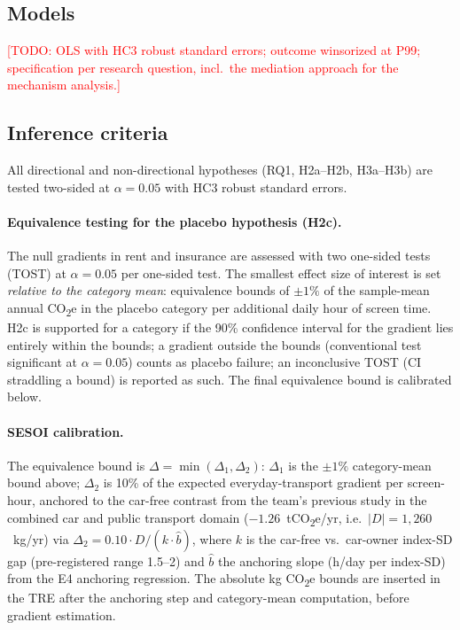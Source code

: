 \documentclass[11pt,a4paper]{article}
\newcommand{\todo}[1]{\textcolor{red}{[TODO: #1]}}
\begin{document}
\subsection{Models}
\todo{OLS with HC3 robust standard errors; outcome winsorized at P99;
specification per research question, incl.\ the mediation approach for the
mechanism analysis.}

\subsection{Inference criteria}
\label{sec:inference}
All directional and non-directional hypotheses (RQ1, H2a--H2b, H3a--H3b) are
tested two-sided at $\alpha = 0.05$ with HC3 robust standard errors.

\paragraph{Equivalence testing for the placebo hypothesis (H2c).} The null
gradients in rent and insurance are assessed with two one-sided tests (TOST) at
$\alpha = 0.05$ per one-sided test. The smallest effect size of interest is set
\emph{relative to the category mean}: equivalence bounds of
$\pm 1\%$ of the sample-mean annual CO\textsubscript{2}e in the placebo
category per additional daily hour of screen time. H2c is supported for a
category if the 90\% confidence interval for the gradient lies entirely within
the bounds; a gradient outside the bounds (conventional test significant at
$\alpha = 0.05$) counts as placebo failure; an inconclusive TOST (CI straddling
a bound) is reported as such. The final equivalence bound is calibrated
below.

\paragraph{SESOI calibration.} The equivalence bound is
$\Delta = \min(\Delta_1, \Delta_2)$: $\Delta_1$ is the $\pm 1\%$
category-mean bound above; $\Delta_2$ is 10\% of the expected
everyday-transport gradient per screen-hour, anchored to the car-free
contrast from the team's previous study in the combined car and public
transport domain
($-1.26$~tCO\textsubscript{2}e/yr, i.e.\ $|D| = 1{,}260$~kg/yr) via
$\Delta_2 = 0.10 \cdot D / (k \cdot \hat{b})$, where $k$ is the car-free
vs.\ car-owner index-SD gap (pre-registered range 1.5--2) and $\hat{b}$
the anchoring slope (h/day per index-SD) from the E4 anchoring
regression. The absolute kg CO\textsubscript{2}e bounds are inserted in
the TRE after the anchoring step and category-mean computation, before
gradient estimation.
\end{document}
